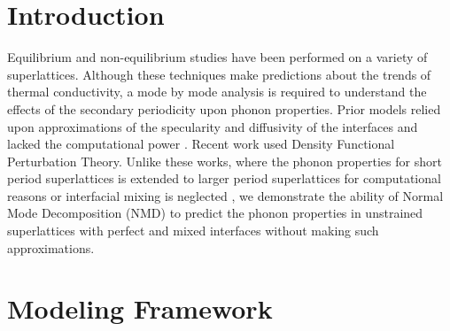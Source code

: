 \documentclass[aps,prb,preprint,preprintnumbers,amsmath,amssymb,floatfix,superscriptaddress]{revtex4}
\begin{document}
\section{Introduction}
Equilibrium \cite {PhysRevB.85.195302} and non-equilibrium \cite {PhysRevB.79.214307,PhysRevB.79.075316,PhysRevB.72.174302} studies have been performed on a variety of superlattices. Although these techniques make predictions about the trends of thermal conductivity, a mode by mode analysis is required to understand the effects of the secondary periodicity upon phonon properties. Prior models relied upon approximations of the specularity and diffusivity of the interfaces \cite {PhysRevB.57.14958} and lacked the computational power \cite {PhysRevB.70.081310}. Recent work \cite{Luckyanova16112012,doi:10.1021/nl202186y} used Density Functional Perturbation Theory. Unlike these works, where the phonon properties for short period superlattices is extended to larger period superlattices for computational reasons \cite{Luckyanova16112012} or interfacial mixing is neglected \cite{doi:10.1021/nl202186y}, we demonstrate the ability of Normal Mode Decomposition (NMD) to predict the phonon properties in unstrained superlattices with perfect and mixed interfaces without making such approximations.

\section{Modeling Framework}
\end{document}

